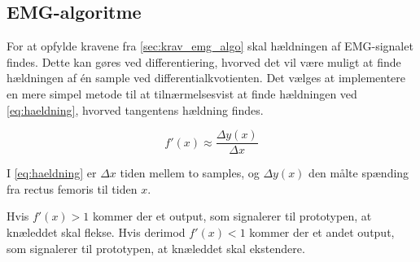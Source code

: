 \subsection{EMG-algoritme}
For at opfylde kravene fra \autoref{sec:krav_emg_algo} skal hældningen af EMG-signalet findes. Dette kan gøres ved differentiering, hvorved det vil være muligt at finde hældningen af én sample ved differentialkvotienten. Det vælges at implementere en mere simpel metode til at tilnærmelsesvist at finde hældningen ved \autoref{eq:haeldning}, hvorved tangentens hældning findes.

\begin{equation}
f'(x)\approx\dfrac{\Delta y(x)}{\Delta x}
\label{eq:haeldning}
\end{equation}

\noindent
I \autoref{eq:haeldning} er $\Delta x$ tiden mellem to samples, og $\Delta y(x)$ den målte spænding fra rectus femoris til tiden $x$. 

Hvis $f'(x)>1$ kommer der et output, som signalerer til prototypen, at knæleddet skal flekse. Hvis derimod $f'(x)<1$ kommer der et andet output, som signalerer til prototypen, at knæleddet skal ekstendere.